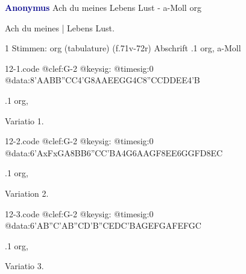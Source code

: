 \documentclass[twocolumn]{book}
\begin{document}
\newline \par \vspace{7pt} \textcolor{darkblue}{\textbf{Anonymus  }}
\newline Ach du meines Lebens Lust - a-Moll
\newline org
\newline \begin{itshape}[f.78v, at left:] Ach du meines | Lebens Lust.\end{itshape} 
\newline \textcolor{darkblue}{}  1 Stimmen: org (tabulature)  (f.71v-72r)
\newline Abschrift
.1  org, a-Moll  
\begin{filecontents*}{12-1.code}
@clef:G-2
@keysig:
@timesig:0
@data:{8'AABB}{''CC}4'G{8AAEE}{GG}4C{8''CCDD}{EE}4'B
\end{filecontents*}
\newline
%
.1  org, \begin{itshape}Variatio 1.\end{itshape}  
\begin{filecontents*}{12-2.code}
@clef:G-2
@keysig:
@timesig:0
@data:{6'AxFxGA}{8BB}{6''CC'BA}4G{6AAGF}{8EE}{6GGFD}{8EC}
\end{filecontents*}
\newline
%
.1  org, \begin{itshape}Variation 2.\end{itshape}  
\begin{filecontents*}{12-3.code}
@clef:G-2
@keysig:
@timesig:0
@data:{6'AB''C'A}{B''CD'B}{''CEDC}{'BAGE}{FGAF}{EFGC}
\end{filecontents*}
\newline
%
.1  org, \begin{itshape}Variatio 3.\end{itshape}  
\end{document}

